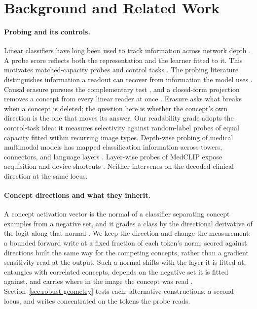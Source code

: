 \section{Background and Related Work}
\label{sec:related}

\paragraph{Probing and its controls.}
Linear classifiers have long been used to track information across network depth \citep{alain2017understanding}. A probe score reflects both the representation and the learner fitted to it. This motivates matched-capacity probes and control tasks \citep{hewitt2019designing}. The probing literature distinguishes information a readout can recover from information the model uses \citep{belinkov2022probing,ravichander2021probing}. Causal erasure pursues the complementary test \citep{ravfogel2020null,elazar2021amnesic}, and a closed-form projection removes a concept from every linear reader at once \citep{belrose2023leace}. Erasure asks what breaks when a concept is deleted; the question here is whether the concept's own direction is the one that moves its answer. Our readability grade adopts the control-task idea: it measures selectivity against random-label probes of equal capacity fitted within recurring image types. Depth-wise probing of medical multimodal models has mapped classification information across towers, connectors, and language layers \citep{zhu2026lost}. Layer-wise probes of MedCLIP expose acquisition and device shortcuts \citep{pedersen2026probes}. Neither intervenes on the decoded clinical direction at the same locus.

\paragraph{Concept directions and what they inherit.}
A concept activation vector is the normal of a classifier separating concept examples from a negative set, and it grades a class by the directional derivative of the logit along that normal \citep{kim2018tcav}. We keep the direction and change the measurement: a bounded forward write at a fixed fraction of each token's norm, scored against directions built the same way for the competing concepts, rather than a gradient sensitivity read at the output. Such a normal shifts with the layer it is fitted at, entangles with correlated concepts, depends on the negative set it is fitted against, and carries where in the image the concept was read \citep{nicolson2025explaining}. Section~\ref{sec:robust-geometry} tests each: alternative constructions, a second locus, and writes concentrated on the tokens the probe reads.

